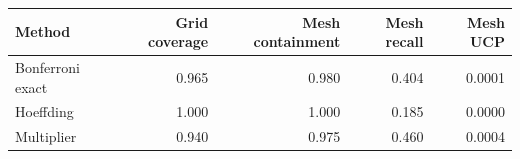 \begin{tabular}{lrrrr}
\toprule
Method & Grid coverage & Mesh containment & Mesh recall & Mesh UCP \\
\midrule
Bonferroni exact & 0.965 & 0.980 & 0.404 & 0.0001 \\
Hoeffding & 1.000 & 1.000 & 0.185 & 0.0000 \\
Multiplier & 0.940 & 0.975 & 0.460 & 0.0004 \\
\bottomrule
\end{tabular}
